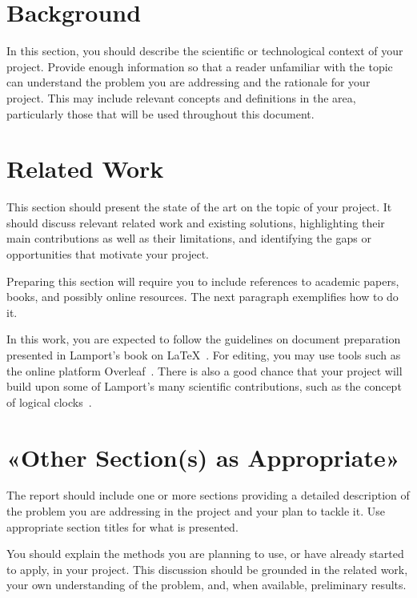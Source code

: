 \documentclass[sigplan]{acmart}
\begin{document}
\section{Background} \label{sec:background}

In this section, you should describe the scientific or technological context of your project. Provide enough information so that a reader unfamiliar with the topic can understand the problem you are addressing and the rationale for your project. This may include relevant concepts and definitions in the area, particularly those that will be used throughout this document.

\section{Related Work} \label{sec:relatedwork}

This section should present the state of the art on the topic of your project. It should discuss relevant related work and existing solutions, highlighting their main contributions as well as their limitations, and identifying the gaps or opportunities that motivate your project.

Preparing this section will require you to include references to academic papers, books, and possibly online resources. The next paragraph exemplifies how to do it.

\medskip

In this work, you are expected to follow the guidelines on document preparation presented in Lamport’s book on \LaTeX~\cite{lamport1994latex}. For editing, you may use tools such as the online platform Overleaf~\cite{overleaf}. There is also a good chance that your project will build upon some of Lamport’s many scientific contributions, such as the concept of logical clocks~\cite{lamport1978clocks}.

\section{«Other Section(s) as Appropriate»} \label{sec:work1}

The report should include one or more sections providing a detailed description of the problem you are addressing in the project and your plan to tackle it. Use appropriate section titles for what is presented. 

You should explain the methods you are planning to use, or have already started to apply, in your project. 
%
This discussion should be grounded in the related work, your own understanding of the problem, and, when available, preliminary results.
\end{document}
